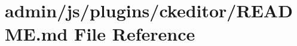 \hypertarget{admin_2js_2plugins_2ckeditor_2_r_e_a_d_m_e_8md}{\section{admin/js/plugins/ckeditor/\-R\-E\-A\-D\-M\-E.md File Reference}
\label{admin_2js_2plugins_2ckeditor_2_r_e_a_d_m_e_8md}
}
